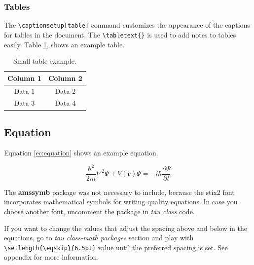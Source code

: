 \documentclass[9pt,a4paper,twoside]{tau}
\begin{document}
        \subsubsection{Tables}
    
            The \verb*|\captionsetup[table]| command customizes the appearance of the captions for tables in the document. The \verb*|\tabletext{}| is used to add notes to tables easily. Table \ref{tab:table}, shows an example table.
            
            \begin{table}[H]
                \centering
                \caption{Small table example.}
    		\label{tab:table}
                \begin{tabular}{cc}
            	\toprule
                    \textbf{Column 1} & \textbf{Column 2} \\
                    \midrule
                    Data 1 & Data 2 \\
                    Data 3 & Data 4 \\
                    \bottomrule
                \end{tabular}
                    
                    
            \end{table}

    \subsection{Equation}
    
        Equation \ref{ec:equation} shows an example equation. 

	\begin{equation} \label{ec:equation}
            \frac{\hbar^2}{2m}\nabla^2\Psi + V(\mathbf{r})\Psi = -i\hbar \frac{\partial\Psi}{\partial t}
	\end{equation} 

        The \textbf{amssymb} package was not necessary to include, because the stix2 font incorporates mathematical symbols for writing quality equations. In case you choose another font, uncomment the package in \textit{tau class} code.

        If you want to change the values that adjust the spacing above and below in the equations, go to \textit{tau class-math packages} section and play with \verb|\setlength{\eqskip}{6.5pt}| value until the preferred spacing is set. See appendix for more information.
\end{document}
